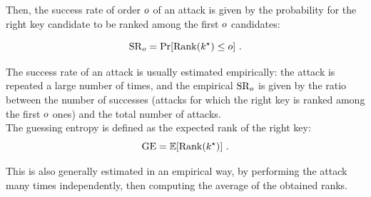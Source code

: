 Then, the success rate of order $o$ of an attack is given by the probability for the right key candidate to be ranked among the first $o$ candidates: 

\begin{equation}
\mathrm{SR}_o = \mathrm{Pr}[\mathrm{Rank}(k^\star)\leq o] \mbox{ .}
\end{equation}

The success rate of an attack is usually estimated empirically: the attack is repeated a large number of times, and the empirical $\mathrm{SR}_o$ is given by the ratio between the number of successes (attacks for which the right key is ranked among the first $o$ ones) and the total number of attacks. \\

The guessing entropy \cite{massey1994guessing} is defined as the expected rank of the right key: 
\begin{equation}
\mathrm{GE} = \mathbb{E}[\mathrm{Rank}(k^\star)]\mbox{ .}
\end{equation}

This is also generally estimated in an empirical way, by performing the attack many times independently, then computing the average of the obtained ranks. 



